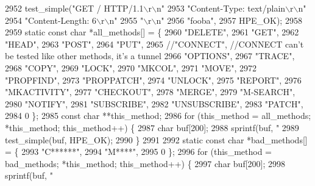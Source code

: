 \begin{DoxyCode}
{2952   test_simple(\textcolor{stringliteral}{"GET / HTTP/1.1\(\backslash\)r\(\backslash\)n"}
2953               \textcolor{stringliteral}{"Content-Type: text/plain\(\backslash\)r\(\backslash\)n"}
2954               \textcolor{stringliteral}{"Content-Length: 6\(\backslash\)r\(\backslash\)n"}
2955               \textcolor{stringliteral}{"\(\backslash\)r\(\backslash\)n"}
2956               \textcolor{stringliteral}{"fooba"},
2957               HPE_OK);
2958 
2959   \textcolor{keyword}{static} \textcolor{keyword}{const} \textcolor{keywordtype}{char} *all\_methods[] = \{
2960     \textcolor{stringliteral}{"DELETE"},
2961     \textcolor{stringliteral}{"GET"},
2962     \textcolor{stringliteral}{"HEAD"},
2963     \textcolor{stringliteral}{"POST"},
2964     \textcolor{stringliteral}{"PUT"},
2965     \textcolor{comment}{//"CONNECT", //CONNECT can't be tested like other methods, it's a tunnel}
2966     \textcolor{stringliteral}{"OPTIONS"},
2967     \textcolor{stringliteral}{"TRACE"},
2968     \textcolor{stringliteral}{"COPY"},
2969     \textcolor{stringliteral}{"LOCK"},
2970     \textcolor{stringliteral}{"MKCOL"},
2971     \textcolor{stringliteral}{"MOVE"},
2972     \textcolor{stringliteral}{"PROPFIND"},
2973     \textcolor{stringliteral}{"PROPPATCH"},
2974     \textcolor{stringliteral}{"UNLOCK"},
2975     \textcolor{stringliteral}{"REPORT"},
2976     \textcolor{stringliteral}{"MKACTIVITY"},
2977     \textcolor{stringliteral}{"CHECKOUT"},
2978     \textcolor{stringliteral}{"MERGE"},
2979     \textcolor{stringliteral}{"M-SEARCH"},
2980     \textcolor{stringliteral}{"NOTIFY"},
2981     \textcolor{stringliteral}{"SUBSCRIBE"},
2982     \textcolor{stringliteral}{"UNSUBSCRIBE"},
2983     \textcolor{stringliteral}{"PATCH"},
2984     0 \};
2985   \textcolor{keyword}{const} \textcolor{keywordtype}{char} **this\_method;
2986   \textcolor{keywordflow}{for} (this\_method = all\_methods; *this\_method; this\_method++) \{
2987     \textcolor{keywordtype}{char} buf[200];
2988     sprintf(buf, \textcolor{stringliteral}{"%
2989     test_simple(buf, HPE_OK);
2990   \}
2991 
2992   \textcolor{keyword}{static} \textcolor{keyword}{const} \textcolor{keywordtype}{char} *bad\_methods[] = \{
2993       \textcolor{stringliteral}{"C******"},
2994       \textcolor{stringliteral}{"M****"},
2995       0 \};
2996   \textcolor{keywordflow}{for} (this\_method = bad\_methods; *this\_method; this\_method++) \{
2997     \textcolor{keywordtype}{char} buf[200];
2998     sprintf(buf, \textcolor{stringliteral}{"%
}}}
\end{DoxyCode}

